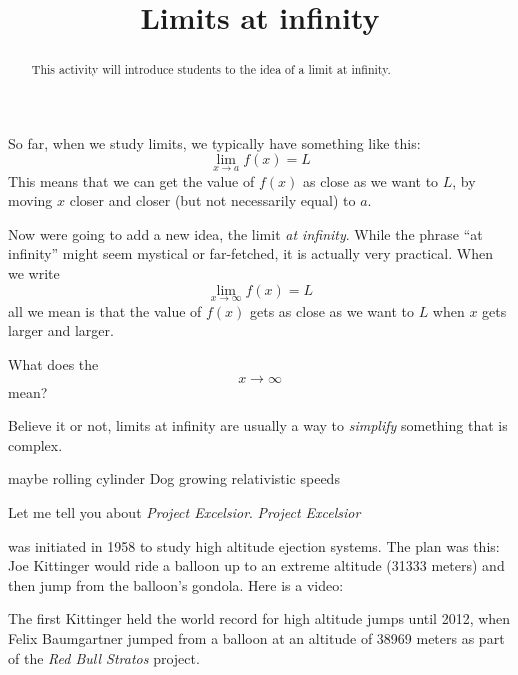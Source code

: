 \documentclass{ximera}
\title{Limits at infinity}
\begin{document}
\begin{abstract}
  This activity will introduce students to the idea of a limit at infinity.
\end{abstract}
\maketitle

So far, when we study limits, we typically have something like this:
\[
\lim_{x\to a} f(x) = L
\]
This means that we can get the value of $f(x)$ as close as we want to
$L$, by moving $x$ closer and closer (but not necessarily equal) to $a$. 

Now were going to add a new idea, the limit \textit{at
  infinity}. While the phrase ``at infinity'' might seem mystical or
far-fetched, it is actually very practical. When we write
\[
\lim_{x\to \infty} f(x) = L
\]
all we mean is that the value of $f(x)$ gets as close as we want to
$L$ when $x$ gets larger and larger. 

\begin{question}
What does the 
\[
x\to \infty
\]
mean?
\begin{solution}
\begin{multiple-choice}
\end{multiple-choice}
\end{solution}
\end{question}


Believe it or not, limits at infinity are usually a way to
\textit{simplify} something that is complex.

maybe rolling cylinder
Dog growing
relativistic speeds


Let me tell you about \textit{Project Excelsior}. \textit{Project
  Excelsior}


was initiated in 1958 to study high altitude ejection systems. The plan
was this: Joe Kittinger would ride a balloon up to an extreme altitude
(31333 meters) and then jump from the balloon's gondola. Here is a
video: 



The first 
Kittinger held the world record for high altitude jumps until 2012,
when Felix Baumgartner jumped from a balloon at an altitude of 38969
meters as part of the \textit{Red Bull Stratos} project.
\end{document}
